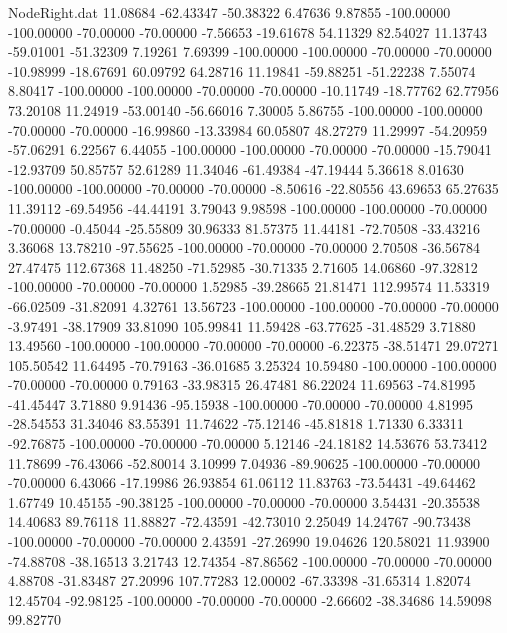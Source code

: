 \begin{filecontents}{NodeRight.dat}
  11.08684  -62.43347  -50.38322     6.47636    9.87855 -100.00000 -100.00000  -70.00000  -70.00000   -7.56653  -19.61678   54.11329   82.54027
  11.13743  -59.01001  -51.32309     7.19261    7.69399 -100.00000 -100.00000  -70.00000  -70.00000  -10.98999  -18.67691   60.09792   64.28716
  11.19841  -59.88251  -51.22238     7.55074    8.80417 -100.00000 -100.00000  -70.00000  -70.00000  -10.11749  -18.77762   62.77956   73.20108
  11.24919  -53.00140  -56.66016     7.30005    5.86755 -100.00000 -100.00000  -70.00000  -70.00000  -16.99860  -13.33984   60.05807   48.27279
  11.29997  -54.20959  -57.06291     6.22567    6.44055 -100.00000 -100.00000  -70.00000  -70.00000  -15.79041  -12.93709   50.85757   52.61289
  11.34046  -61.49384  -47.19444     5.36618    8.01630 -100.00000 -100.00000  -70.00000  -70.00000   -8.50616  -22.80556   43.69653   65.27635
  11.39112  -69.54956  -44.44191     3.79043    9.98598 -100.00000 -100.00000  -70.00000  -70.00000   -0.45044  -25.55809   30.96333   81.57375
  11.44181  -72.70508  -33.43216     3.36068   13.78210  -97.55625 -100.00000  -70.00000  -70.00000    2.70508  -36.56784   27.47475  112.67368
  11.48250  -71.52985  -30.71335     2.71605   14.06860  -97.32812 -100.00000  -70.00000  -70.00000    1.52985  -39.28665   21.81471  112.99574
  11.53319  -66.02509  -31.82091     4.32761   13.56723 -100.00000 -100.00000  -70.00000  -70.00000   -3.97491  -38.17909   33.81090  105.99841
  11.59428  -63.77625  -31.48529     3.71880   13.49560 -100.00000 -100.00000  -70.00000  -70.00000   -6.22375  -38.51471   29.07271  105.50542
  11.64495  -70.79163  -36.01685     3.25324   10.59480 -100.00000 -100.00000  -70.00000  -70.00000    0.79163  -33.98315   26.47481   86.22024
  11.69563  -74.81995  -41.45447     3.71880    9.91436  -95.15938 -100.00000  -70.00000  -70.00000    4.81995  -28.54553   31.34046   83.55391
  11.74622  -75.12146  -45.81818     1.71330    6.33311  -92.76875 -100.00000  -70.00000  -70.00000    5.12146  -24.18182   14.53676   53.73412
  11.78699  -76.43066  -52.80014     3.10999    7.04936  -89.90625 -100.00000  -70.00000  -70.00000    6.43066  -17.19986   26.93854   61.06112
  11.83763  -73.54431  -49.64462     1.67749   10.45155  -90.38125 -100.00000  -70.00000  -70.00000    3.54431  -20.35538   14.40683   89.76118
  11.88827  -72.43591  -42.73010     2.25049   14.24767  -90.73438 -100.00000  -70.00000  -70.00000    2.43591  -27.26990   19.04626  120.58021
  11.93900  -74.88708  -38.16513     3.21743   12.74354  -87.86562 -100.00000  -70.00000  -70.00000    4.88708  -31.83487   27.20996  107.77283
  12.00002  -67.33398  -31.65314     1.82074   12.45704  -92.98125 -100.00000  -70.00000  -70.00000   -2.66602  -38.34686   14.59098   99.82770

\end{filecontents}

